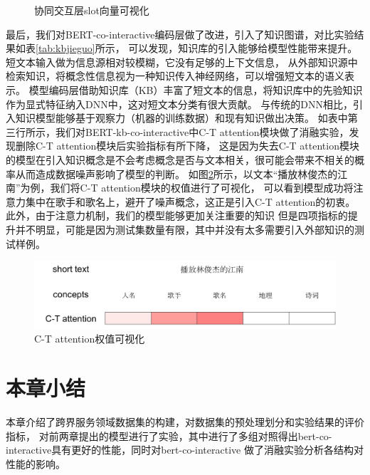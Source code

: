 \begin{figure}[htbp]
  \centering
   \centering
 \caption{协同交互层slot向量可视化}
 \label{fig:visual}
 \end{figure}
最后，我们对BERT-co-interactive编码层做了改进，引入了知识图谱，对比实验结果如表\ref{tab:kbjieguo}所示，
可以发现，知识库的引入能够给模型性能带来提升。短文本输入做为信息源相对较模糊，它没有足够的上下文信息，
从外部知识源中检索知识，将概念性信息视为一种知识传入神经网络，可以增强短文本的语义表示。
模型编码层借助知识库（KB）丰富了短文本的信息，将知识库中的先验知识作为显式特征纳入DNN中，这对短文本分类有很大贡献。
与传统的DNN相比，引入知识模型能够基于观察力（机器的训练数据）和现有知识做出决策。
如表中第三行所示，我们对BERT-kb-co-interactive中C-T attention模块做了消融实验，发现删除C-T attention模块后实验指标有所下降，
这是因为失去C-T attention模块的模型在引入知识概念是不会考虑概念是否与文本相关，很可能会带来不相关的概率从而造成数据噪声影响了模型的判断。
如图\ref{fig:ctattention}所示，以文本“播放林俊杰的江南”为例，我们将C-T attention模块的权值进行了可视化，
可以看到模型成功将注意力集中在歌手和歌名上，避开了噪声概念，这正是引入C-T attention的初衷。
此外，由于注意力机制，我们的模型能够更加关注重要的知识
但是四项指标的提升并不明显，可能是因为测试集数量有限，其中并没有太多需要引入外部知识的测试样例。
\begin{figure}[htbp]
  \centering
  \includegraphics[scale=0.3]{./images/ctattention.png}
  \caption{C-T attention权值可视化}
  \label{fig:ctattention}
\end{figure}

  \section{本章小结}
  本章介绍了跨界服务领域数据集的构建，对数据集的预处理划分和实验结果的评价指标，
对前两章提出的模型进行了实验，其中进行了多组对照得出bert-co-interactive具有更好的性能，同时对bert-co-interactive
做了消融实验分析各结构对性能的影响。
